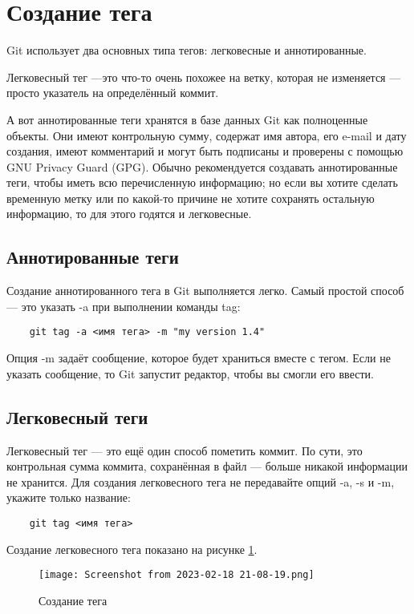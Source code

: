 \section{Создание тега}

Git использует два основных типа тегов: легковесные и аннотированные.

Легковесный тег ---это что-то очень похожее на ветку,
которая не изменяется --- просто указатель на определённый коммит.

А вот аннотированные теги хранятся в базе данных Git как полноценные объекты.
Они имеют контрольную сумму, содержат имя автора, его e-mail и дату создания,
имеют комментарий и могут быть подписаны и проверены с помощью
GNU Privacy Guard (GPG). Обычно рекомендуется создавать аннотированные теги,
чтобы иметь всю перечисленную информацию; но если вы хотите сделать
временную метку или по какой-то причине не хотите сохранять остальную
информацию, то для этого годятся и легковесные.

\subsection{Аннотированные теги}
Создание аннотированного тега в Git выполняется легко.
Самый простой способ --- это указать -a при выполнении команды tag:

\begin{verbatim}
	git tag -a <имя тега> -m "my version 1.4"
\end{verbatim}

Опция -m задаёт сообщение, которое будет храниться вместе с тегом.
Если не указать сообщение, то Git запустит редактор,
чтобы вы смогли его ввести.

\subsection{Легковесный теги}
Легковесный тег --- это ещё один способ пометить коммит. По сути,
это контрольная сумма коммита, сохранённая в файл --- больше никакой
информации не хранится. Для создания легковесного тега не передавайте
опций -a, -s и -m, укажите только название:

\begin{verbatim}
	git tag <имя тега>
\end{verbatim}

Создание легковесного тега показано на рисунке \ref{fig:git:tag}.

\begin{figure}[h!tp]
	\centering
	\texttt{[image: Screenshot from 2023-02-18 21-08-19.png]}
	\caption{Создание тега}
	\label{fig:git:tag}
\end{figure}


